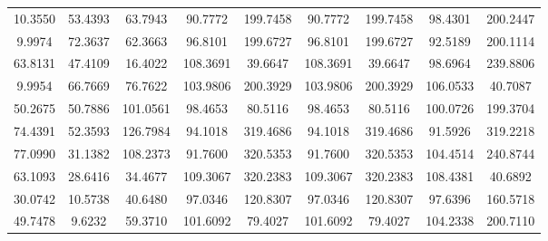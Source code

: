 \documentclass[withoutpreface,bwprint]{cumcmthesis} %
\begin{document}
\begin{appendices}
\begin{table}[htbp!]
\begin{tabular}{@{}ccccccccc@{}}
							10.3550        & 53.4393        & 63.7943     & 90.7772     & 199.7458    & 90.7772         & 199.7458        & 98.4301         & 200.2447        \\
							9.9974         & 72.3637        & 62.3663     & 96.8101     & 199.6727    & 96.8101         & 199.6727        & 92.5189         & 200.1114        \\
							63.8131        & 47.4109        & 16.4022     & 108.3691    & 39.6647     & 108.3691        & 39.6647         & 98.6964         & 239.8806        \\
							9.9954         & 66.7669        & 76.7622     & 103.9806    & 200.3929    & 103.9806        & 200.3929        & 106.0533        & 40.7087         \\
							50.2675        & 50.7886        & 101.0561    & 98.4653     & 80.5116     & 98.4653         & 80.5116         & 100.0726        & 199.3704        \\
							74.4391        & 52.3593        & 126.7984    & 94.1018     & 319.4686    & 94.1018         & 319.4686        & 91.5926         & 319.2218        \\
							77.0990        & 31.1382        & 108.2373    & 91.7600     & 320.5353    & 91.7600         & 320.5353        & 104.4514        & 240.8744        \\
							63.1093        & 28.6416        & 34.4677     & 109.3067    & 320.2383    & 109.3067        & 320.2383        & 108.4381        & 40.6892         \\
							30.0742        & 10.5738        & 40.6480     & 97.0346     & 120.8307    & 97.0346         & 120.8307        & 97.6396         & 160.5718        \\
							49.7478        & 9.6232         & 59.3710     & 101.6092    & 79.4027     & 101.6092        & 79.4027         & 104.2338        & 200.7110        \\ \bottomrule
						\end{tabular}
					\end{table}
				
				
				

\end{appendices}
\end{document}
